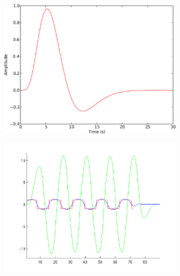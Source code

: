 \documentclass[preprint,5p,authoryear]{elsarticle}
\begin{document}
\begin{figure}
\centering
\begin{subfigure}{0.4\textwidth}
\centering
\includegraphics[width=\textwidth]{figures/hrf}
\caption{}
\label{fig:wiener-hrf}
\end{subfigure}
\begin{subfigure}{0.4\textwidth}
\centering
\includegraphics[width=\textwidth]{figures/wiener-square}
\caption{}
\label{fig:wiener-square}
\end{subfigure}
\begin{subfigure}{0.4\textwidth}
\centering

\end{subfigure}
\end{figure}
\end{document}
